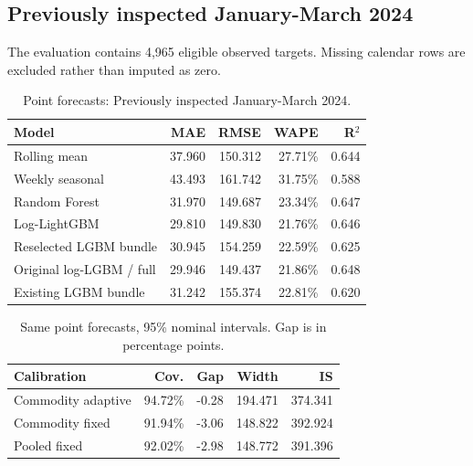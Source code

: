 \documentclass[conference]{IEEEtran}
\begin{document}
\subsection{Previously inspected January-March 2024}
The evaluation contains 4,965 eligible observed targets. Missing calendar rows are excluded rather than imputed as zero.
\begin{table}[!ht]\centering\small\caption{Point forecasts: Previously inspected January-March 2024.}\begin{tabular}{lrrrr}
\toprule
Model & MAE & RMSE & WAPE & R$^2$ \\
\midrule
Rolling mean & 37.960 & 150.312 & 27.71\% & 0.644 \\
Weekly seasonal & 43.493 & 161.742 & 31.75\% & 0.588 \\
Random Forest & 31.970 & 149.687 & 23.34\% & 0.647 \\
Log-LightGBM & 29.810 & 149.830 & 21.76\% & 0.646 \\
Reselected LGBM bundle & 30.945 & 154.259 & 22.59\% & 0.625 \\
Original log-LGBM / full & 29.946 & 149.437 & 21.86\% & 0.648 \\
Existing LGBM bundle & 31.242 & 155.374 & 22.81\% & 0.620 \\
\bottomrule
\end{tabular}
\end{table}
\begin{table}[!ht]\centering\small\caption{Same point forecasts, 95\% nominal intervals. Gap is in percentage points.}\begin{tabular}{lrrrr}
\toprule
Calibration & Cov. & Gap & Width & IS \\
\midrule
Commodity adaptive & 94.72\% & -0.28 & 194.471 & 374.341 \\
Commodity fixed & 91.94\% & -3.06 & 148.822 & 392.924 \\
Pooled fixed & 92.02\% & -2.98 & 148.772 & 391.396 \\
\bottomrule
\end{tabular}
\end{table}
\end{document}

